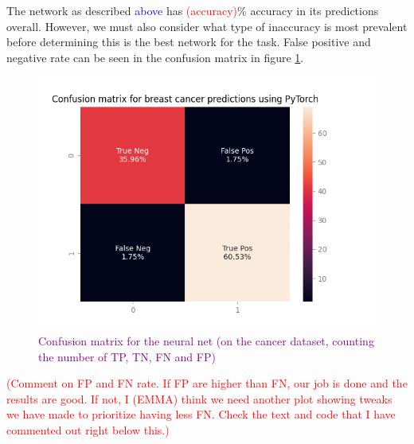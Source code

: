The network as described \textcolor{blue}{above} has \textcolor{red}{(accuracy)}\% accuracy in its predictions overall. However, we must also consider what type of inaccuracy is most prevalent before determining this is the best network for the task. False positive and negative rate can be seen in the confusion matrix in figure \ref{fig:confusionmatrix}.
\begin{figure}
    \centering
    \includegraphics[width=\linewidth]{figures/plots/confusionmatrix.png}
    \caption{\textcolor{purple}{Confusion matrix for the neural net (on the cancer dataset, counting the number of TP, TN, FN and FP)}}
    \label{fig:confusionmatrix}
\end{figure}


\textcolor{red}{(Comment on FP and FN rate. If FP are higher than FN, our job is done and the results are good. If not, I (EMMA) think we need another plot showing tweaks we have made to prioritize having less FN. Check the text and code that I have commented out right below this.)}



